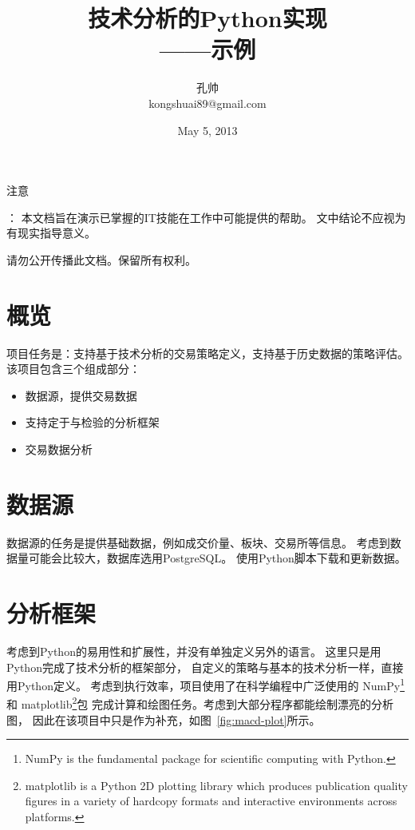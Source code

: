 \documentclass{article}
\begin{document}
\title{技术分析的Python实现\\[2ex]——示例}
\author{孔帅\\
kongshuai89@gmail.com}
\date{May 5, 2013}

\maketitle

\begin{framed}
	\begin{large}注意\end{large}：
	本文档旨在演示已掌握的IT技能在工作中可能提供的帮助。
	文中结论不应视为有现实指导意义\footnotemark。

	\bigskip
	
	请勿公开传播此文档。保留所有权利。
\end{framed}



\section{概览}
项目任务是：支持基于技术分析的交易策略定义，支持基于历史数据的策略评估。
该项目包含三个组成部分：
\begin{itemize}[itemsep=0pt]
\item 数据源，提供交易数据
\item 支持定于与检验的分析框架
\item 交易数据分析
\end{itemize}

\section{数据源}
数据源的任务是提供基础数据，例如成交价量、板块、交易所等信息。
考虑到数据量可能会比较大，数据库选用PostgreSQL。
使用Python脚本下载和更新数据。

\section{分析框架}
考虑到Python的易用性和扩展性，并没有单独定义另外的语言。
这里只是用Python完成了技术分析的框架部分，
自定义的策略与基本的技术分析一样，直接用Python定义。
考虑到执行效率，项目使用了在科学编程中广泛使用的
NumPy\footnote{NumPy is the fundamental package 
for scientific computing with Python.}和
matplotlib\footnote{matplotlib is a Python 2D plotting library 
which produces publication quality figures in a variety of hardcopy 
formats and interactive environments across platforms.}包
完成计算和绘图任务。考虑到大部分程序都能绘制漂亮的分析图，
因此在该项目中只是作为补充，如图~\ref{fig:macd-plot}所示。
\end{document}
